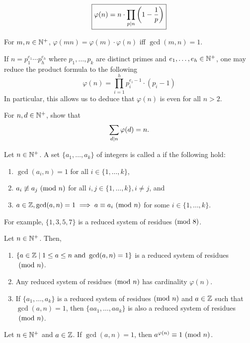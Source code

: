 \[
    \boxed{\varphi(n) = n \cdot \prod_{p \mid n} \left( 1 - \frac{1}{p} \right)}
\]
\begin{cor} \label{cor:phi-multiplicity}
    For $m,n \in \mathbb{N}^+$, $\varphi(mn) = \varphi(m)\cdot \varphi(n)$ iff $\gcd(m,n) = 1$.
\end{cor}
If $n = p_1^{e_1} \cdots p_h^{e_h}$ where $p_1, \ldots, p_k$ are distinct primes and $e_1, \ldots, e_h \in \mathbb{N}^+$, one may reduce the product formula to the following
\[
    \varphi(n) = \prod_{i=1}^h p_i^{e_i - 1} \cdot (p_i - 1)
\]
In particular, this allows us to deduce that $\varphi(n)$ is even for all $n > 2$.
\begin{exe}
    For $n,d \in \mathbb{N}^+$, show that
    \[
        \sum_{d \mid n} \varphi(d) = n.
    \]
\end{exe}
\begin{defn}
    Let $n \in \mathbb{N}^+$. A set $\{a_1, \ldots, a_k\}$ of integers is called a  if the following hold:
    \begin{enumerate}
        \item $\gcd(a_i, n) = 1$ for all $i \in \{1, \ldots, k\}$,
        \item $a_i \not\equiv a_j \ (\mathrm{mod}\ n)$ for all $i,j \in \{1, \ldots, k\}, i \neq j$, and
        \item $a \in \mathbb{Z}, \gcd(a,n) = 1 \implies a \equiv a_i \ (\mathrm{mod}\ n)$ for some $i \in \{1, \ldots, k\}$.
    \end{enumerate}
\end{defn}
For example, $\{1, 3, 5, 7\}$ is a reduced system of residues$\ (\mathrm{mod}\ 8)$.
\begin{prop} \label{prop:rsr-mod}
    Let $n \in \mathbb{N}^+$. Then, 
    \begin{enumerate}
        \item $\{ a \in \mathbb{Z} \mid 1 \leq a \leq n \text{ and } \gcd(a,n) =1 \}$ is a reduced system of residues$\ (\mathrm{mod}\ n)$.
        \item Any reduced system of residues$\ (\mathrm{mod}\ n)$ has cardinality $\varphi(n)$.
        \item If $\{a_1, \ldots, a_k\}$ is a reduced system of residues$\ (\mathrm{mod}\ n)$ and $a \in \mathbb{Z}$ such that $\gcd(a,n) = 1$, then $\{aa_1, \ldots, aa_k\}$ is also a reduced system of residues$\ (\mathrm{mod}\ n)$.
    \end{enumerate}
\end{prop}
\begin{theorem} \label{thm:euler}
    Let $n \in \mathbb{N}^+$ and $a \in \mathbb{Z}$. If $\gcd(a,n) = 1$, then $a^{\varphi(n)} \equiv 1 \ (\mathrm{mod}\ n)$.
\end{theorem}
